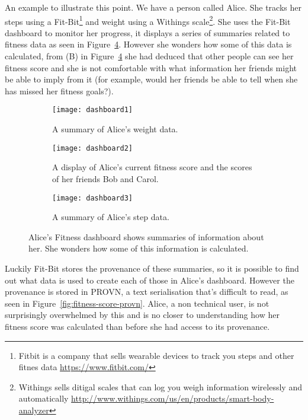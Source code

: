 An example to illustrate this point. We have a person called Alice. She tracks her steps using a Fit-Bit\footnote{Fitbit is a company that sells wearable devices to track you steps and other fitnes data \url{https://www.fitbit.com/}} and weight using a Withings scale\footnote{Withings sells ditigal scales that can log you weigh information wirelessly and automatically \url{http://www.withings.com/us/en/products/smart-body-analyzer}}. She uses the Fit-Bit dashboard to monitor her progress, it displays a series of summaries related to fitness data as seen in Figure~\ref{fig:fitness-dashboard}. However she wonders how some of this data is calculated, from (B) in Figure~\ref{fig:fitness-dashboard} she had deduced that other people can see her fitness score and she is not comfortable with what information her friends might be able to imply from it (for example, would her friends be able to tell when she has missed her fitness goals?).

\begin{figure}[h]
	\centering
  \begin{subfigure}[t]{0.5\textwidth}
	\label{fig:fitness-dashboard-weight}
    \centering
	\texttt{[image: dashboard1]}
    \caption{A summary of Alice's weight data.}
  \end{subfigure}
  \begin{subfigure}[t]{0.4\textwidth}
	\label{fig:fitness-dashboard-score}
    \centering
	\texttt{[image: dashboard2]}
    \caption{A display of Alice's current fitness score and the scores of her friends Bob and Carol.}
  \end{subfigure}
  \begin{subfigure}[t]{0.8\textwidth}
	\label{fig:fitness-dashboard-steps}
    \centering
	\texttt{[image: dashboard3]}
    \caption{A summary of Alice's step data.}
  \end{subfigure}

	\caption{Alice's Fitness dashboard shows summaries of information about her. She wonders how some of this information is calculated.}
	\label{fig:fitness-dashboard}
\end{figure}


Luckily Fit-Bit stores the provenance of these summaries, so it is possible to find out what data is used to create each of those in Alice's dashboard. However the provenance is stored in PROVN, a text serialisation that's difficult to read, as seen in Figure~\ref{fig:fitness-score-provn}. Alice, a non technical user, is not surprisingly overwhelmed by this and is no closer to understanding how her fitness score was calculated than before she had access to its provenance.

